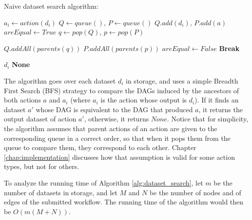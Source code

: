 \begin{algorithm}
\begin{singlespace}
\caption{Naive dataset search algorithm:}
\label{alg:dataset_search}
\begin{algorithmic}[1]
		\State $a_i \gets action(d_i)$ 
		\State $Q \gets queue()$, $P \gets queue()$
		\State $Q.add(d_i)$, $P.add(a)$
		\State $areEqual \gets True$
			\State $q \gets pop(Q)$, $p \gets pop(P)$
			
				\State $Q.addAll(parents(q))$ 
				\State $P.addAll(parents(p))$ 
			\Else
				\State $areEqual \gets False$
				\State \textbf{Break}
			\EndIf
			
		\EndWhile
			\Return $d_i$
		\EndIf
	\EndFor
	\Return \textbf{None}
\EndProcedure
\end{algorithmic}
\end{singlespace}
\end{algorithm}

The algorithm goes over each dataset $d_i$ in storage, and uses a simple Breadth First Search (BFS) strategy to compare the DAGs induced by the ancestors of both actions $a$ and $a_i$ (where $a_i$ is the action whose output is $d_i$).  If it finds an dataset $a'$ whose DAG is equivalent to the DAG that produced $a$, it returns the output dataset of action $a'$, otherwise, it returns $None$.  Notice that for simplicity, the algorithm assumes that parent actions of an action are given to the corresponding queue in a correct order, so that when it pops them from the queue to compare them, they correspond to each other.  Chapter \ref{chap:implementation} discusses how that assumption is valid for some action types, but not for others.

To analyze the running time of Algorithm \ref{alg:dataset_search}, let $m$ be the number of datasets in storage, and let $M$ and $N$ be the number of nodes and of edges of the submitted workflow.  The running time of the algorithm would then be $O(m (M + N))$.

